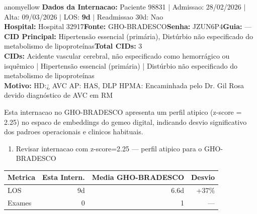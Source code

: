 \documentclass[a4paper,10pt]{article}
\begin{document}
\begin{anomalycard}[Internacao 119168 | GHO-BRADESCO | MODERADO (z=2.25)]{anomyellow}
\textbf{Dados da Internacao:} Paciente 98831 $\mid$ Admissao: 28/02/2026 $\mid$ Alta: 09/03/2026 $\mid$ LOS: \textbf{9d} $\mid$ Readmissao 30d: Nao\\
\textbf{Hospital:} Hospital 32917\quad\textbf{Fonte:} GHO-BRADESCO\quad\textbf{Senha:} JZUN6P4\quad\textbf{Guia:} ---\\
\textbf{CID Principal:} {\small Hipertensão essencial (primária), Distúrbio não especificado do metabolismo de lipoproteínas}\quad\textbf{Total CIDs:} 3\\

\textbf{CIDs:} {\scriptsize Acidente vascular cerebral, não especificado como hemorrágico ou isquêmico | Hipertensão essencial (primária) | Distúrbio não especificado do metabolismo de lipoproteínas}\\

\textbf{Motivo:} {\scriptsize HD:¿ AVC  AP: HAS, DLP  HPMA: Encaminhada pelo Dr. Gil Rosa devido diagnóstico de AVC em RM}\\

\vspace{2pt}\begin{tcolorbox}[colback=severityred!20,colframe=anomyellow,title={\textbf{Interpretacao de Negocio}},fonttitle=\bfseries\small,left=4pt,right=4pt,top=3pt,bottom=3pt]
{\small Esta internacao no GHO-BRADESCO apresenta um perfil atipico (z-score = 2.25) no espaco de embeddings do gemeo digital, indicando desvio significativo dos padroes operacionais e clinicos habituais.}
\end{tcolorbox}
\begin{tcolorbox}[colback=severityyellow!30,colframe=anomorange,title={\textbf{Recomendacoes Especificas}},fonttitle=\bfseries\small,left=4pt,right=4pt,top=3pt,bottom=3pt]
\begin{enumerate}[nosep,leftmargin=16pt]
\item {\small Revisar internacao com z-score=2.25 --- perfil atipico para o GHO-BRADESCO}
\end{enumerate}
\end{tcolorbox}
\begin{center}\begin{tabular}{l r r r}\toprule\textbf{Metrica} & \textbf{Esta Intern.} & \textbf{Media GHO-BRADESCO} & \textbf{Desvio} \\\midrule
LOS & 9d & 6.6d & +37\% \\
Exames & 0 & 1 & --- \\
\bottomrule\end{tabular}\end{center}


\end{anomalycard}
\end{document}
